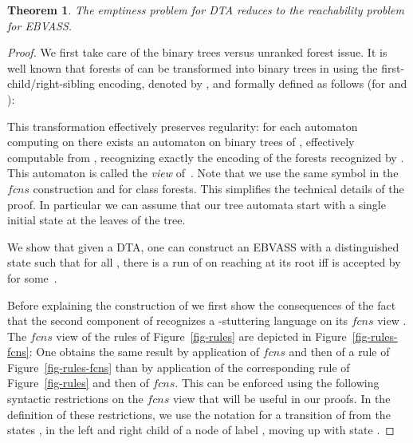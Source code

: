 \documentclass{CSML}
\newtheorem{theorem}{Theorem}
\newcommand\ebvass{\textup{EBVASS}\xspace}
\newcommand\dad{\textup{DTA}\xspace}
\newcommand\fcns{\ensuremath{\mathit{fcns}}\xspace}
\begin{document}
\begin{theorem}\label{prop-reduct}
  The emptiness problem for \dad reduces to the reachability problem for
  \ebvass.
\end{theorem}
\begin{proof}
We first take care of the binary trees versus unranked forest issue.
It is well known that forests of 
can be transformed into binary trees in  
using the first-child/right-sibling encoding, denoted by ,
and formally defined as follows (for  and ):



This transformation effectively preserves regularity: 
for each automaton  computing on  
there exists an automaton  on binary trees of ,
effectively computable from , 
recognizing exactly the  encoding of the forests recognized by .  
This automaton  is called the  \emph{view} of~.  
Note that we use the same  symbol in the \fcns construction and 
for class forests. This simplifies the technical details of the proof. In
particular we can assume that our tree automata start with a single initial
state at the leaves of the tree.


\medskip

  We show that given a \dad , one can construct an \ebvass  with a
  distinguished state  such that for all , there is
  a run of  on  reaching  at its root iff
   is accepted by  for some~.

\medskip

Before explaining the construction of  we first show the consequences of
the fact that the second component of  recognizes a -stuttering language on its \fcns view .
The \fcns view of the rules of Figure~\ref{fig-rules} are depicted in
Figure~\ref{fig-rules-fcns}: One obtains the same result by application of \fcns and then of a rule of Figure~\ref{fig-rules-fcns} 
than by application of the corresponding rule of Figure~\ref{fig-rules} and then of \fcns. 
This can be enforced using the following syntactic restrictions on the \fcns view  that will be useful in our proofs.
In the definition of these restrictions, 
we use the notation  
for a transition of  from the states ,  
in the left and right child of a node of label , moving up with state .



\end{proof}
\end{document}
